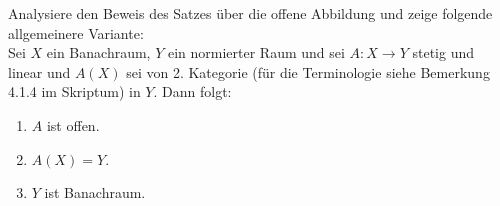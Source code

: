 \begin{exercise}

Analysiere den Beweis des Satzes über die offene Abbildung und zeige folgende
allgemeinere Variante: \\

Sei $X$ ein Banachraum, $Y$ ein normierter Raum und sei $A: X \rightarrow Y$ stetig
und linear und $A(X)$ sei von 2. Kategorie (für die Terminologie siehe Bemerkung
4.1.4 im Skriptum) in $Y$.
Dann folgt:

\begin{enumerate}[label = (\roman*)]
  \item $A$ ist offen.
  \item $A(X) = Y$.
  \item $Y$ ist Banachraum.
\end{enumerate}

\end{exercise}

